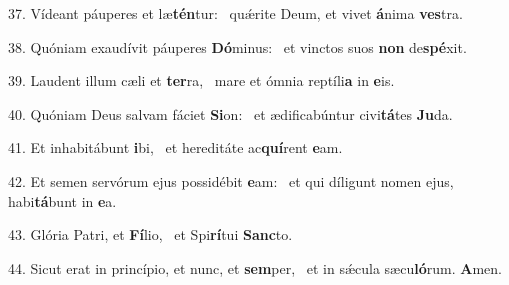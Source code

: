 37. Vídeant páuperes et læ\textbf{tén}tur: \ast\  quǽrite Deum, et vivet \textbf{á}nima \textbf{ves}tra.\

38. Quóniam exaudívit páuperes \textbf{Dó}minus: \ast\  et vinctos suos \textbf{non} de\textbf{spé}xit.\

39. Laudent illum cæli et \textbf{ter}ra, \ast\  mare et ómnia reptíli\textbf{a} in \textbf{e}is.\

40. Quóniam Deus salvam fáciet \textbf{Si}on: \ast\  et ædificabúntur civi\textbf{tá}tes \textbf{Ju}da.\

41. Et inhabitábunt \textbf{i}bi, \ast\  et hereditáte ac\textbf{quí}rent \textbf{e}am.\

42. Et semen servórum ejus possidébit \textbf{e}am: \ast\  et qui díligunt nomen ejus, habi\textbf{tá}bunt in \textbf{e}a.\

43. Glória Patri, et \textbf{Fí}lio, \ast\  et Spi\textbf{rí}tui \textbf{Sanc}to.\

44. Sicut erat in princípio, et nunc, et \textbf{sem}per, \ast\  et in sǽcula sæcu\textbf{ló}rum. \textbf{A}men.\

